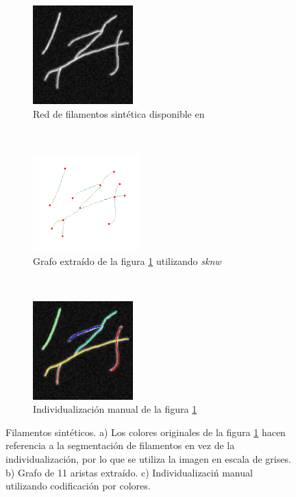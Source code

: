  \begin{figure}[h!]
    \centering
    \begin{subfigure}[t]{0.3\textwidth}
        \centering
        \includegraphics[height=1.5in]{benchImages/Synth-QuantitativeIFS-Fig7_gray.png}
        \caption{Red de filamentos sint\'etica disponible en \cite{qiu2014quantitative}}
        \label{fig:synth-QFS-7-original}
    \end{subfigure}%
    ~ 
    \begin{subfigure}[t]{0.3\textwidth}
        \centering
        \includegraphics[height=1.5in]{benchImages/Synth-QuantitativeIFS-Fig7_graph_labeled_thick.png}
        \caption{Grafo extra\'ido de la figura \ref{fig:synth-QFS-7-original} utilizando {\it sknw}}
        \label{fig:synth-QFS-7-graph}
    \end{subfigure}
    ~ 
    \begin{subfigure}[t]{0.3\textwidth}
        \centering
        \includegraphics[height=1.5in]{benchImages/Synth-QuantitativeIFS-Fig7_groundTruth.png}
        \caption{Individualizaci\'on manual de la figura \ref{fig:synth-QFS-7-original}}
        \label{fig:synth-QFS-7-graph}
    \end{subfigure}
    \caption{Filamentos sint\'eticos. a) Los colores originales de la figura \ref{fig:synth-QFS-7-original} hacen referencia a la segmentaci\'on de filamentos en vez de la individualizaci\'on, por lo que se utiliza la imagen en escala de grises. b) Grafo de 11 aristas extra\'ido. c) Individualizaci\'n manual utilizando codificaci\'on por colores.}
    \label{fig:synth-QFS-7}
\end{figure}


